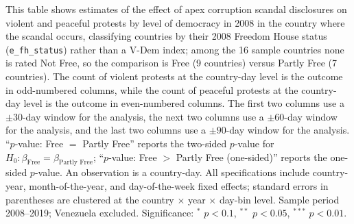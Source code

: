 \documentclass[11pt]{article}
\let\mathbetasym\beta
\renewcommand{\beta}{\ensuremath{\mathbetasym}}
\begin{document}
\begin{table}[htb!]
    \caption{Effect by 2008 level of democracy: Freedom House status.}
    \label{tab:sup_democracy_fh}
    \begin{center}
        \scriptsize{}
    \end{center}
    \footnotesize{This table shows estimates of the effect of apex corruption scandal disclosures on violent and peaceful protests by level of democracy in 2008 in the country where the scandal occurs, classifying countries by their 2008 Freedom House status (\texttt{e\_fh\_status}) rather than a V-Dem index; among the 16 sample countries none is rated Not Free, so the comparison is Free (9 countries) versus Partly Free (7 countries). The count of violent protests at the country-day level is the outcome in odd-numbered columns, while the count of peaceful protests at the country-day level is the outcome in even-numbered columns. The first two columns use a $\pm30$-day window for the analysis, the next two columns use a $\pm60$-day window for the analysis, and the last two columns use a $\pm90$-day window for the analysis. ``$p$-value: Free $=$ Partly Free'' reports the two-sided $p$-value for $H_0:\beta_{\text{Free}}=\beta_{\text{Partly Free}}$; ``$p$-value: Free $>$ Partly Free (one-sided)'' reports the one-sided $p$-value. An observation is a country-day. All specifications include country-year, month-of-the-year, and day-of-the-week fixed effects; standard errors in parentheses are clustered at the country $\times$ year $\times$ day-bin level. Sample period 2008--2019; Venezuela excluded. Significance: $^{*}$ $p<0.1$, $^{**}$ $p<0.05$, $^{***}$ $p<0.01$.}
\end{table}
\end{document}
